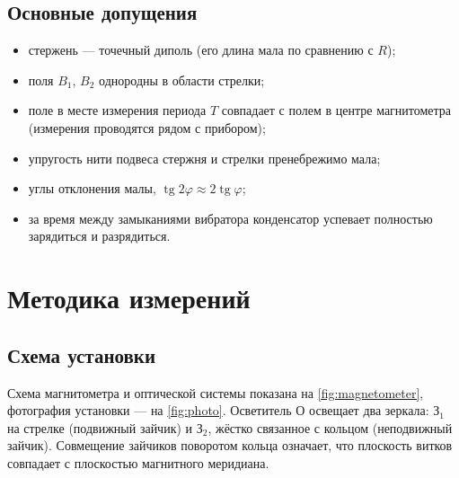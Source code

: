 \documentclass[a4paper,12pt]{article}
\begin{document}
\subsection{Основные допущения}
\begin{itemize}
    \item стержень --- точечный диполь (его длина мала по сравнению с $R$);
    \item поля $B_1$, $B_2$ однородны в области стрелки;
    \item поле в месте измерения периода $T$ совпадает с полем в центре
          магнитометра (измерения проводятся рядом с прибором);
    \item упругость нити подвеса стержня и стрелки пренебрежимо мала;
    \item углы отклонения малы, $\operatorname{tg}2\varphi\approx2\operatorname{tg}\varphi$;
    \item за время между замыканиями вибратора конденсатор успевает полностью
          зарядиться и разрядиться.
\end{itemize}

\section{Методика измерений}

\subsection{Схема установки}
Схема магнитометра и оптической системы показана на
\cref{fig:magnetometer}, фотография установки --- на \cref{fig:photo}. Осветитель О освещает два зеркала:
З$_1$ на стрелке (подвижный зайчик) и З$_2$, жёстко связанное с кольцом
(неподвижный зайчик). Совмещение зайчиков поворотом кольца означает, что
плоскость витков совпадает с плоскостью магнитного меридиана.
\end{document}

